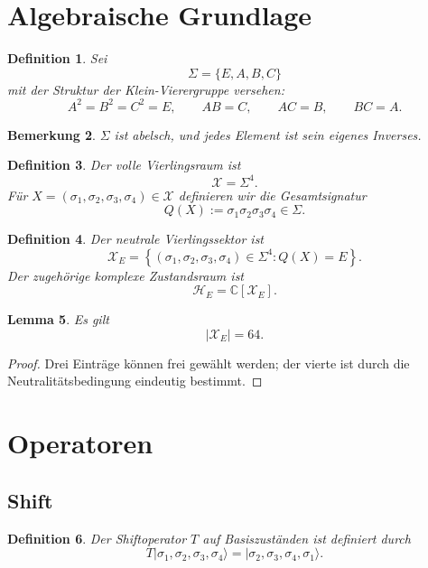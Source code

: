\documentclass[11pt,a4paper]{article}
\newtheorem{definition}{Definition}[section]
\newtheorem{lemma}[definition]{Lemma}
\newtheorem{remark}[definition]{Bemerkung}
\newcommand{\SigmaBM}{\Sigma}
\newcommand{\XE}{\mathcal X_E}
\newcommand{\HE}{\mathcal H_E}
\begin{document}
	\section{Algebraische Grundlage}
	
	\begin{definition}
		Sei
		\[
		\SigmaBM=\{E,A,B,C\}
		\]
		mit der Struktur der Klein-Vierergruppe versehen:
		\[
		A^2=B^2=C^2=E,\qquad AB=C,\qquad AC=B,\qquad BC=A.
		\]
	\end{definition}
	
	\begin{remark}
		\(\SigmaBM\) ist abelsch, und jedes Element ist sein eigenes Inverses.
	\end{remark}
	
	\begin{definition}
		Der volle Vierlingsraum ist
		\[
		\mathcal X=\SigmaBM^4.
		\]
		Für
		\(
		X=(\sigma_1,\sigma_2,\sigma_3,\sigma_4)\in\mathcal X
		\)
		definieren wir die Gesamtsignatur
		\[
		Q(X):=\sigma_1\sigma_2\sigma_3\sigma_4\in\SigmaBM.
		\]
	\end{definition}
	
	\begin{definition}
		Der neutrale Vierlingssektor ist
		\[
		\XE
		=
		\left\{
		(\sigma_1,\sigma_2,\sigma_3,\sigma_4)\in\SigmaBM^4:
		Q(X)=E
		\right\}.
		\]
		Der zugehörige komplexe Zustandsraum ist
		\[
		\HE=\mathbb C[\XE].
		\]
	\end{definition}
	
	\begin{lemma}
		Es gilt
		\[
		|\XE|=64.
		\]
	\end{lemma}
	
	\begin{proof}
		Drei Einträge können frei gewählt werden; der vierte ist durch die Neutralitätsbedingung eindeutig bestimmt.
	\end{proof}
	
	\section{Operatoren}
	
	\subsection{Shift}
	
	\begin{definition}
		Der Shiftoperator \(T\) auf Basiszuständen ist definiert durch
		\[
		T|\sigma_1,\sigma_2,\sigma_3,\sigma_4\rangle
		=
		|\sigma_2,\sigma_3,\sigma_4,\sigma_1\rangle.
		\]
	\end{definition}
	
\end{document}
